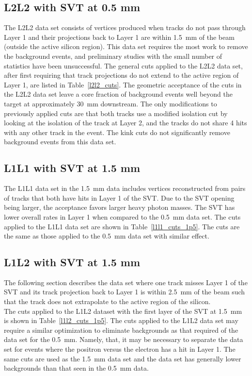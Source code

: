 \subsection{L2L2 with SVT at 0.5 mm}

The L2L2 data set consists of vertices produced when tracks do not pass through Layer 1 and their projections back to Layer 1 are within 1.5~mm of the beam (outside the active silicon region). This data set requires the most work to remove the background events, and preliminary studies with the small number of statistics have been unsuccessful. The general cuts applied to the L2L2 data set, after first requiring that track projections do not extend to the active region of Layer 1, are listed in Table~\ref{l2l2_cuts}. The geometric acceptance of the cuts in the L2L2 data set leave a core fraction of background events well beyond the target at approximately 30~mm downstream. The only modifications to previously applied cuts are that both tracks use a modified isolation cut by looking at the isolation of the track at Layer 2, and the tracks do not share 4 hits with any other track in the event.  The kink cuts do not significantly remove background events from this data set.

\subsection{L1L1 with SVT at 1.5 mm}
The L1L1 data set in the 1.5~mm data includes vertices reconstructed from pairs of tracks that both have hits in Layer 1 of the SVT. Due to the SVT opening being larger, the acceptance favors larger heavy photon masses. The SVT has lower overall rates in Layer 1 when compared to the 0.5~mm data set. The cuts applied to the L1L1 data set are shown in Table~\ref{l1l1_cuts_1p5}. The cuts are the same as those applied to the 0.5~mm data set with similar effect.

\subsection{L1L2 with SVT at 1.5 mm}
The following section describes the data set where one track misses Layer 1 of the SVT and its track projection back to Layer 1 is within 2.5~mm of the beam such that the track does not extrapolate to the active region of the silicon.\\
\indent The cuts applied to the L1L2 dataset with the first layer of the SVT at 1.5~mm is shown in Table~\ref{l1l2_cuts_1p5}. The cuts applied to the L1L2 data set may require a similar optimization to eliminate backgrounds as that required of the data set for the 0.5~mm. Namely, that, it may be necessary to separate the data set for events where the positron versus the electron has a hit in Layer 1. The same cuts are used as the 1.5~mm data set and the data set has generally lower backgrounds than that seen in the 0.5~mm data.

